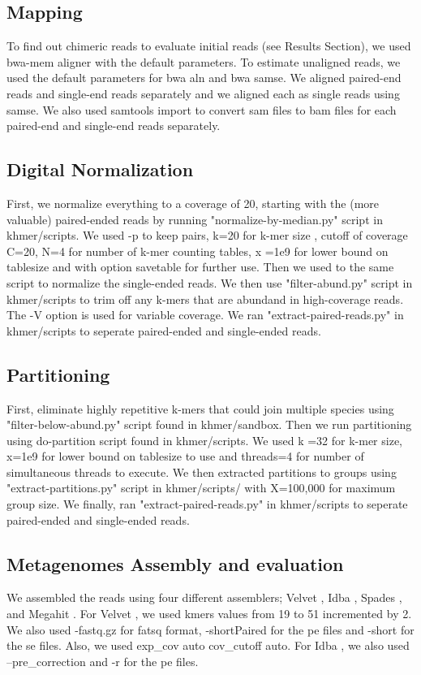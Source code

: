 \subsection*{Mapping}

To find out chimeric reads to evaluate initial reads (see Results Section), we used bwa-mem aligner with the default parameters.  To estimate unaligned reads, we used the default parameters for bwa aln and bwa samse. We aligned paired-end reads and single-end reads separately and we aligned each as single reads using samse. We also used samtools import to convert  sam files to bam files for each paired-end and single-end reads separately. 


\subsection*{Digital Normalization} 
First, we normalize everything to a coverage of 20, starting with the (more valuable) paired-ended reads by running "normalize-by-median.py" script in khmer/scripts. We used -p to keep pairs, k=20 for k-mer size , cutoff of coverage C=20, N=4 for number of k-mer counting tables, x =1e9 for lower bound on tablesize  and  with option savetable for further use. Then we used to the same script to normalize the single-ended reads. We then use "filter-abund.py" script in khmer/scripts to trim off any k-mers that are abundand in high-coverage reads. The -V option is used for variable coverage. We ran "extract-paired-reads.py" in khmer/scripts to seperate paired-ended and single-ended reads. 

\subsection*{Partitioning} 
First, eliminate highly repetitive k-mers that could join multiple species using "filter-below-abund.py" script found in khmer/sandbox.  Then we run partitioning using do-partition script found in khmer/scripts. We used k =32 for k-mer size, x=1e9  for lower bound on tablesize to use and threads=4 for number of simultaneous threads to execute. 
We then extracted partitions to groups using "extract-partitions.py" script in khmer/scripts/ with X=100,000 for maximum group size. We finally, ran "extract-paired-reads.py" in khmer/scripts to seperate paired-ended and single-ended reads. 

\subsection*{Metagenomes Assembly and evaluation}
We assembled the reads using four different assemblers; Velvet \cite{velvet}, Idba \cite{idba}, Spades \cite{spades}, and Megahit \cite{megahit}. For  Velvet \cite{velvet}, we used kmers values from 19 to 51 incremented by 2. We also used -fastq.gz for fatsq format,  -shortPaired for the pe files and -short for the se files. Also, we used \-exp\_cov auto \-cov\_cutoff auto.  For Idba \cite{idba},  we also used  --pre\_correction and -r for the pe files. 


